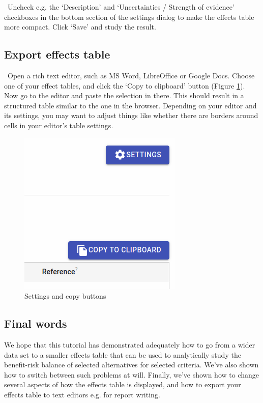 \documentclass[00_mcda_tutorial.tex]{subfiles}
\begin{document}
\noindent \leftpointright \, Uncheck e.g. the ‘Description’ and ‘Uncertainties / Strength of evidence’ checkboxes in the bottom section of the settings dialog to make the effects table more compact. Click ‘Save’ and study the result.

\subsection*{Export effects table}
\noindent \leftpointright \, Open a rich text editor, such as MS Word, LibreOffice or Google Docs. Choose one of your effect tables, and click the ‘Copy to clipboard’ button (Figure \ref{fig:clipboard_button}). Now go to the editor and paste the selection in there. This should result in a structured table similar to the one in the browser. Depending on your editor and its settings, you may want to adjust things like whether there are borders around cells in your editor’s table settings.

\begin{figure}[!h]
    \centering
    \includegraphics[width=.5\textwidth]{fig/clipboardButton.png}
    \caption{Settings and copy buttons}
    \label{fig:clipboard_button}
\end{figure}

\subsection*{Final words}
We hope that this tutorial has demonstrated adequately how to go from a wider data set to a smaller effects table that can be used to analytically study the benefit-risk balance of selected alternatives for selected criteria. We’ve also shown how to switch between such problems at will. Finally, we’ve shown how to change several aspects of how the effects table is displayed, and how to export your effects table to text editors e.g. for report writing.
\end{document}
